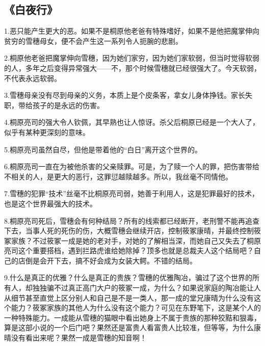 \subsection{《白夜行》}
1.恶只能产生更大的恶。如果不是桐原他老爸有特殊嗜好，如果不是他把魔掌伸向贫穷的雪穗母女，便不会产生这一系列令人扼腕的悲剧。

2.桐原他老爸把魔掌伸向雪穗，因为她们家穷，因为她们家软弱，但当时觉得软弱的人，多年之后变得异常强大——不，那个时候雪穗就已经很强大了。今天软弱，不代表永远软弱。

3.雪穗母亲没有尽到母亲的义务，本质上是个皮条客，拿女儿身体挣钱。家长失职，带给孩子的是永远的伤害。

4.桐原亮司的强大令人钦佩，其早熟也让人惊讶。杀父后桐原已经是一个大人了，似乎有某种更深刻的意味。

5.桐原亮司虽然自尽，但他是带着他的“白日”离开这个世界的。

6.桐原亮司一直在为被他杀害的父亲赎罪。可是，为了赎一个人的罪，把伤害带给不相关的人，是更大的恶行，这罪愆越赎越多。所以，我丝毫不同情他。

7.雪穗的犯罪“技术”丝毫不比桐原亮司弱，她善于利用人，这是犯罪最好的技术，也是这个世界最强大的技术。

8.桐原亮司死后，雪穗会有何种结局？所有的线索都已经断开，老刑警不能再追查下去，当事人死的死伤的伤，大概雪穗会继续开店，控制筱冢康晴，并最终控制筱冢家族？不过筱冢一成是她的老对手，对她的了解相当深，而她自己又失去了桐原亮司这个重要搭档，遇到拦路虎谁给她除掉？顶多也就是总裁夫人这个结局吧？自己的店倒是会开下去，搞不好会成为女装大鳄。不错的结局。

9.什么是真正的优雅？什么是真正的贵族？雪穗的优雅陶冶，骗过了这个世界的所有人，却独独骗不过真正高门大户的筱冢一成，为什么？如果说家庭的陶冶能让人从细节甚至直觉上区分别人和自己是不是一类人，那一成的堂兄康晴为什么没有这个能力？筱冢家族的其他人为什么没有这个能力？可见在东野笔下，这是某个人的一种特殊能力。一成能从雪穗的猫眼中看出她身上不属于贵族的那种狡黠和狠毒，算是这部小说的一个后门吧？果然还是富贵人看富贵人比较准，但等等，为什么康晴没有看出来呢？果然一成是雪穗的知音啊！
